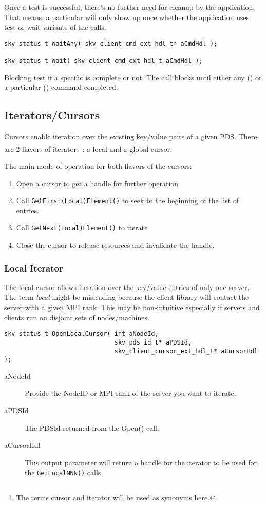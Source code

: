 Once a test is successful, there's no further need for cleanup by the
application.  That means, a particular  will only show
up once whether the application uses test or wait variants of the
calls.

\begin{lstlisting}
skv_status_t WaitAny( skv_client_cmd_ext_hdl_t* aCmdHdl );

skv_status_t Wait( skv_client_cmd_ext_hdl_t aCmdHdl );
\end{lstlisting}
Blocking test if a specific  is complete or not.  The
call blocks until either any () or a particular
() command completed.




\subsection{Iterators/Cursors}\label{sec:api:cursor}
Cursors enable iteration over the existing key/value pairs of a given
PDS.  There are 2 flavors of iterators\footnote{The terms cursor and
  iterator will be used as synonyms here.}: a local and a global
cursor.

The main mode of operation for both flavors of the cursors:
\begin{enumerate}
\item Open a cursor to get a handle for further operation
\item Call \verb|GetFirst(Local)Element()| to seek to the beginning of
  the list of entries.
\item Call \verb|GetNext(Local)Element()| to iterate
\item Close the cursor to release resources and invalidate the handle.
\end{enumerate}


\subsubsection{Local Iterator}\label{sec:api:cursor_local}
The local cursor allows iteration over the key/value entries of only
one server.  The term \emph{local} might be misleading because the
client library will contact the server with a given MPI rank.  This
may be non-intuitive especially if servers and clients run on disjoint
sets of nodes/machines.

\begin{lstlisting}
skv_status_t OpenLocalCursor( int aNodeId,
                              skv_pds_id_t* aPDSId,
                              skv_client_cursor_ext_hdl_t* aCursorHdl );
\end{lstlisting}
\begin{description}
\item[aNodeId] Provide the NodeID or MPI-rank of the server you want
  to iterate.
\item[aPDSId] The PDSId returned from the Open() call.
\item[aCursorHdl] This output parameter will return a handle for the
  iterator to be used for the \verb|GetLocalNNN()| calls.
\end{description}

